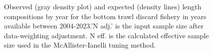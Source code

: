 \documentclass[
]{scrartcl}
\begin{document}
\begin{figure}[H]


\caption{\label{fig-len-fit-btdis}Observed (gray density plot) and
expected (density lines) length compositions by year for the bottom
trawl discard fishery in years available between 2004-2023.'N adj.' is
the input sample size after data-weighting adjustment. N eff. is the
calculated effective sample size used in the McAllister-Ianelli tuning
method.}

\end{figure}%
\end{document}
